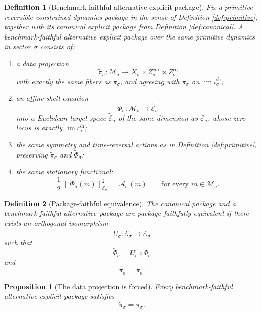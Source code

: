 \documentclass[11pt]{article}
\newcommand{\SubSpace}[1]{\mathcal M_{#1}}
\newcommand{\DataProj}[1]{\pi_{#1}}
\newcommand{\SubTarget}[1]{\mathcal E_{#1}}
\newcommand{\ShellEquation}[1]{\Phi_{#1}}
\newcommand{\ShellEmbed}[1]{\iota_{#1}^{\mathrm{sh}}}
\newcommand{\StationaryFunctional}[1]{\mathscr A_{#1}}
\newcommand{\AltDataProj}[1]{\widetilde\pi_{#1}}
\newcommand{\AltShellEquation}[1]{\widetilde\Phi_{#1}}
\newcommand{\AltTarget}[1]{\widetilde{\mathcal E}_{#1}}
\newtheorem{definition}{Definition}
\newtheorem{proposition}{Proposition}
\begin{document}
\begin{definition}[Benchmark-faithful alternative explicit package]
\label{def:alt}
Fix a primitive reversible constrained dynamics package in the sense of Definition \ref{def:primitive}, together with its canonical explicit package from Definition \ref{def:canonical}. A \emph{benchmark-faithful alternative explicit package} over the same primitive dynamics in sector \(\sigma\) consists of:
\begin{enumerate}
    \item a data projection
    \[
    \AltDataProj{\sigma}:\SubSpace{\sigma}\to
    X_{\sigma}\times Z_{\sigma}^{\mathrm{cur}}\times Z_{\sigma}^{\mathrm{eq}}
    \]
    with exactly the same fibers as \(\DataProj{\sigma}\), and agreeing with \(\DataProj{\sigma}\) on \(\operatorname{im}\ShellEmbed{\sigma}\);
    \item an affine shell equation
    \[
    \AltShellEquation{\sigma}:\SubSpace{\sigma}\to \AltTarget{\sigma}
    \]
    into a Euclidean target space \(\AltTarget{\sigma}\) of the same dimension as \(\SubTarget{\sigma}\), whose zero locus is exactly \(\operatorname{im}\ShellEmbed{\sigma}\);
    \item the same symmetry and time-reversal actions as in Definition \ref{def:primitive}, preserving \(\AltDataProj{\sigma}\) and \(\AltShellEquation{\sigma}\);
    \item the same stationary functional:
    \begin{equation}
    \frac12\,
    \|\AltShellEquation{\sigma}(m)\|_{\AltTarget{\sigma}}^{2}
    =
    \StationaryFunctional{\sigma}(m)
    \qquad
    \text{for every }m\in\SubSpace{\sigma}.
    \label{eq:samefunctional}
    \end{equation}
\end{enumerate}
\end{definition}

\begin{definition}[Package-faithful equivalence]
\label{def:equiv}
The canonical package and a benchmark-faithful alternative package are \emph{package-faithfully equivalent} if there exists an orthogonal isomorphism
\[
U_{\sigma}:\SubTarget{\sigma}\to \AltTarget{\sigma}
\]
such that
\[
\AltShellEquation{\sigma}=U_{\sigma}\circ\ShellEquation{\sigma}
\]
and
\[
\AltDataProj{\sigma}=\DataProj{\sigma}.
\]
\end{definition}

\begin{proposition}[The data projection is forced]
\label{prop:dataneq}
Every benchmark-faithful alternative explicit package satisfies
\[
\AltDataProj{\sigma}=\DataProj{\sigma}.
\]
\end{proposition}
\end{document}

